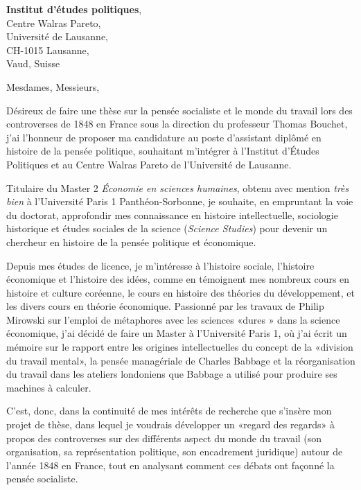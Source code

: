 

\begin{letter}{\textbf{Institut d'études politiques}, \\
    Centre Walras Pareto,\\
    Université de Lausanne,\\
    CH-1015 Lausanne,\\
    Vaud, Suisse}

  \opening{Mesdames, Messieurs,}

  Désireux de faire une thèse sur la pensée socialiste et le monde
  du travail lors des controverses de 1848 en France sous la
  direction du professeur Thomas Bouchet, j'ai l'honneur de
  proposer ma candidature au poste d'assistant diplômé en histoire
  de la pensée politique, souhaitant m'intégrer à l'Institut
  d'Études Politiques et au Centre Walras Pareto de l'Université
  de Lausanne.

  Titulaire du Master 2 \textit{Économie en sciences humaines},
  obtenu avec mention \textit{très bien} à l'Université Paris 1
  Panthéon-Sorbonne, je souhaite, en empruntant la voie du
  doctorat, approfondir mes connaissance en histoire
  intellectuelle, sociologie historique et études sociales de la
  science (\textit{Science Studies}) pour devenir un chercheur en
  histoire de la pensée politique et économique.

  Depuis mes études de licence, je m'intéresse à l'histoire
  sociale, l'histoire économique et l'histoire des idées, comme en
  témoignent mes nombreux cours en histoire et culture coréenne,
  le cours en histoire des théories du développement, et les
  divers cours en théorie économique. Passionné par les travaux de
  Philip Mirowski sur l'emploi de métaphores avec les sciences
  «dures » dans la science économique, j'ai décidé de faire un
  Master à l'Université Paris 1, où j'ai écrit un mémoire sur le
  rapport entre les origines intellectuelles du concept de la
  «division du travail mental», la pensée managériale de Charles
  Babbage et la réorganisation du travail dans les ateliers
  londoniens que Babbage a utilisé pour produire ses machines à
  calculer.

  C'est, donc, dans la continuité de mes intérêts de recherche que
  s’insère mon projet de thèse, dans lequel je voudrais développer
  un «regard des regards» à propos des controverses sur des
  différents aspect du monde du travail (son organisation, sa
  représentation politique, son encadrement juridique) autour de
  l'année 1848 en France, tout en analysant comment ces débats ont
  façonné la pensée socialiste.


\end{letter}

